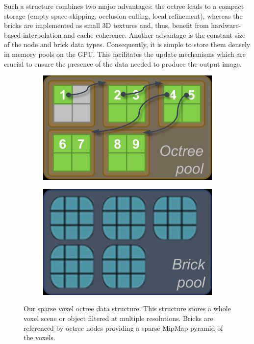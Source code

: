 Such a structure combines two major advantages: the octree leads to a compact storage (empty space skipping, occlusion culling, local refinement), whereas the bricks are implemented as small 3D textures and, thus, benefit from hardware-based interpolation and cache coherence. Another advantage is the constant size of the node and brick data types. Consequently, it is simple to store them densely in memory pools on the GPU. This facilitates the update mechanisms which are crucial to ensure the presence of the data needed to produce the output image.

\begin{figure}
\begin{center}
	\begin{subfigure}[b]{0.4\textwidth}
		\includegraphics[width=1.0\textwidth]{graphics/vct/vct-13-8}
	\end{subfigure}
	\begin{subfigure}[b]{0.4\textwidth}
		\includegraphics[width=1.0\textwidth]{graphics/vct/vct-13-9}
	\end{subfigure}
\end{center}
	\caption{Our sparse voxel octree data structure. This structure stores a whole voxel scene or object filtered at multiple resolutions. Bricks are referenced by octree nodes providing a sparse MipMap pyramid of the voxels.}
	\label{f:vct-gpu-representation}
\end{figure}




